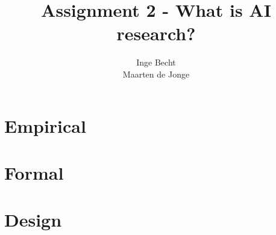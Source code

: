 \documentclass[a4paper, 12pt]{article}
\author{Inge Becht \\ Maarten de Jonge}
\title{Assignment 2 - What is AI research?}
\begin{document}
\maketitle

\section{Empirical}

\section{Formal}

\section{Design}
	
\end{document}

